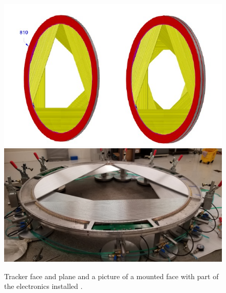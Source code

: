 \documentclass[12pt,a4paper,openright, oneside, titlepage]{book} %
\begin{document}
\begin{figure}[h!]
\centering
\includegraphics[scale=0.3]{Tracker_plane}
\includegraphics[scale=0.35]{Tracker_plane_picture}
\caption{Tracker face and plane \cite{MTDR} and a picture of a mounted face with part of the electronics installed \cite{Manolis}.}
\label{_Tracker_plane}
\end{figure}
\end{document}
